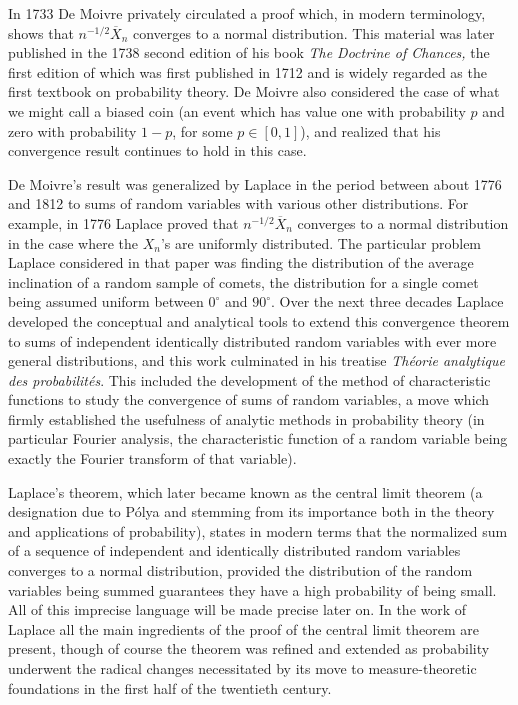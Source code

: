 \documentclass{article}
\theoremstyle{definition}
\begin{document}
In 1733 De Moivre privately circulated a proof which, in modern terminology, shows that $n^{-1/2} \overline X_n$ converges to a normal distribution. This material was later published in the 1738 second edition of his book {\em The Doctrine of Chances,} the first edition of which was first published in 1712 and is widely regarded as the first textbook on probability theory. De Moivre also considered the case of what we might call a biased coin (an event which has value one with probability $p$ and zero with probability $1-p$, for some $p \in [0,1]$), and realized that his convergence result continues to hold in this case.

De Moivre's result was generalized by Laplace in the period between about 1776 and 1812 to sums of random variables with various other distributions. For example, in 1776 Laplace proved that $n^{-1/2} \overline X_n$ converges to a normal distribution in the case where the $X_n$'s are uniformly distributed. The particular problem Laplace considered in that paper was finding the distribution of the average inclination of a random sample of comets, the distribution for a single comet being assumed uniform between $0^\circ$ and $90^\circ$. Over the next three decades Laplace developed the conceptual and analytical tools to extend this convergence theorem to sums of independent identically distributed random variables with ever more general distributions, and this work culminated in his treatise {\em Th\'eorie analytique des probabilit\'es}. This included the development of the method of characteristic functions to study the convergence of sums of random variables, a move which firmly established the usefulness of analytic methods in probability theory (in particular Fourier analysis, the characteristic function of a random variable being exactly the Fourier transform of that variable).

Laplace's theorem, which later became known as the central limit theorem (a designation due to P\'olya and stemming from its importance both in the theory and applications of probability), states in modern terms that the normalized sum of a sequence of independent and identically distributed random variables converges to a normal distribution, provided the distribution of the random variables being summed guarantees they have a high probability of being small. All of this imprecise language will be made precise later on. In the work of Laplace all the main ingredients of the proof of the central limit theorem are present, though of course the theorem was refined and extended as probability underwent the radical changes necessitated by its move to measure-theoretic foundations in the first half of the twentieth century.
\end{document}
